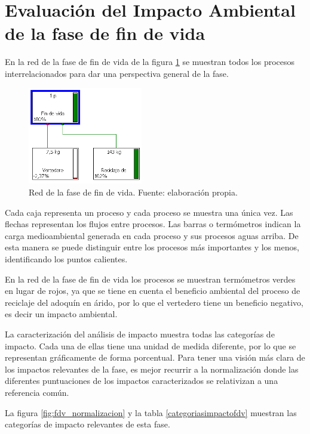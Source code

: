 \section{Evaluación del Impacto Ambiental de la fase de fin de vida}

En la red de la fase de fin de vida de la figura \ref{fig:fdv_red} se muestran todos los procesos interrelacionados para dar una perspectiva general de la fase.

\begin{figure}[!htb]
\centering
\includegraphics[width=5cm]{img/fdv_red.png}
\caption[Red de la fase de fin de vida.]{Red de la fase de fin de vida. Fuente: elaboración propia.}
\label{fig:fdv_red}
\end{figure}

Cada caja representa un proceso y cada proceso se muestra una única vez. Las flechas representan los flujos entre procesos. Las barras o termómetros indican la carga medioambiental generada en cada proceso y sus procesos aguas arriba. De esta manera se puede distinguir entre los procesos más importantes y los menos, identificando los puntos calientes.

En la red de la fase de fin de vida los procesos se muestran termómetros verdes en lugar de rojos, ya que se tiene en cuenta el beneficio ambiental del proceso de reciclaje del adoquín en árido, por lo que el vertedero tiene un beneficio negativo, es decir un impacto ambiental.

La caracterización del análisis de impacto muestra todas las categorías de impacto. Cada una de ellas tiene una unidad de medida diferente, por lo que se representan gráficamente de forma porcentual. Para tener una visión más clara de los impactos relevantes de la fase, es mejor recurrir a la normalización donde las diferentes puntuaciones de los impactos caracterizados se relativizan a una referencia común.

La figura \ref{fig:fdv_normalizacion} y la tabla \ref{categoriasimpactofdv} muestran las categorías de impacto relevantes de esta fase.

